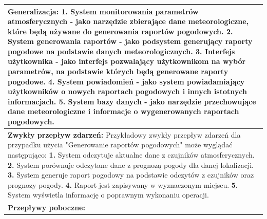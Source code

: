 \documentclass{article}
\begin{document}
\begin{center}
    \begin{center}
        \begin{tabular}{|l|l|l|}
        \hline
        \multicolumn{3}{|p{\dimexpr\linewidth-2\tabcolsep-2\arrayrulewidth}|}{\textbf{Generalizacja:}
        \newline
        \textbf{1.} System monitorowania parametrów atmosferycznych - jako narzędzie zbierające dane meteorologiczne, które będą używane do generowania raportów pogodowych.
        \newline
        \textbf{2.} System generowania raportów - jako podsystem generujący raporty pogodowe na podstawie danych meteorologicznych.
        \newline
        \textbf{3.} Interfejs użytkownika - jako interfejs pozwalający użytkownikom na wybór parametrów, na podstawie których będą generowane raporty pogodowe.
        \newline
        \textbf{4.} System powiadomień - jako system powiadamiający użytkowników o nowych raportach pogodowych i innych istotnych informacjach.
        \newline
        \textbf{5.} System bazy danych - jako narzędzie przechowujące dane meteorologiczne i informacje o wygenerowanych raportach pogodowych.} \\
        \hline
        \hline
        \multicolumn{3}{|p{\dimexpr\linewidth-2\tabcolsep-2\arrayrulewidth}|}{\textbf{Zwykły przepływ zdarzeń:}
        \newline
        Przykładowy zwykły przepływ zdarzeń dla przypadku użycia "Generowanie raportów pogodowych" może wyglądać następująco:
        \newline
        \textbf{1.} System odczytuje aktualne dane z czujników atmosferycznych.
        \newline
        \textbf{2.} System porównuje odczytane dane z prognozą pogody dla danej lokalizacji.
        \newline
        \textbf{3.} System generuje raport pogodowy na podstawie odczytów z czujników oraz prognozy pogody.
        \newline
        \textbf{4.} Raport jest zapisywany w wyznaczonym miejscu.
        \newline
        \textbf{5.} System wyświetla informację o poprawnym wykonaniu operacji.} \\
        \hline
        \hline
        \multicolumn{3}{|p{\dimexpr\linewidth-2\tabcolsep-2\arrayrulewidth}|}{\textbf{Przepływy poboczne:}
        \newline
}
\end{tabular}
\end{center}
\end{center}
\end{document}
